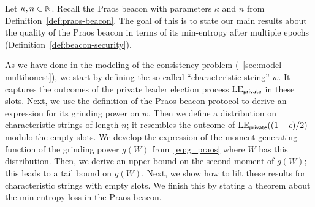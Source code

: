 

Let $\kappa, n \in \mathbb{N}$. 
Recall the Praos beacon with parameters $\kappa$ and $n$ from Definition~\ref{def:praos-beacon}. 
The goal of this \Section is to state our main results 
about the quality of the Praos beacon 
in terms of its min-entropy after multiple epochs (Definition~\ref{def:beacon-security}).

As we have done in the modeling of the consistency problem 
(\Section~\ref{sec:model-multihonest}), 
we start by defining the so-called ``characteristic string'' $w$. 
It captures the outcomes of the private leader election process $\mathrm{LE}_\mathsf{private}$ 
in these slots. 
Next, we use the definition of the Praos beacon protocol to 
derive an expression for its grinding power on $w$.
Then we define a distribution on characteristic strings of length $n$; 
it resembles the outcome of $\mathrm{LE}_\mathsf{private}((1-\epsilon)/2)$ 
modulo the empty slots. 
We develop the expression of the moment generating function of the 
grinding power $g(W)$ from~\eqref{eq:g_praos} 
where $W$ has this distribution. 
Then, we derive an upper bound on the second moment of $g(W)$;
this leads to a  tail bound on $g(W)$.
Next, we show how to lift these results 
for characteristic strings with empty slots.
We finish this \Section by stating a theorem about the min-entropy loss in the Praos beacon. 





\newcommand{\Suffix}[2]{ \mathsf{suffix}({#1},{#2})}
\newcommand{\CoinTossingLC}{\Pi_\mathsf{lc}^{\Players(\alpha),k,n}}






